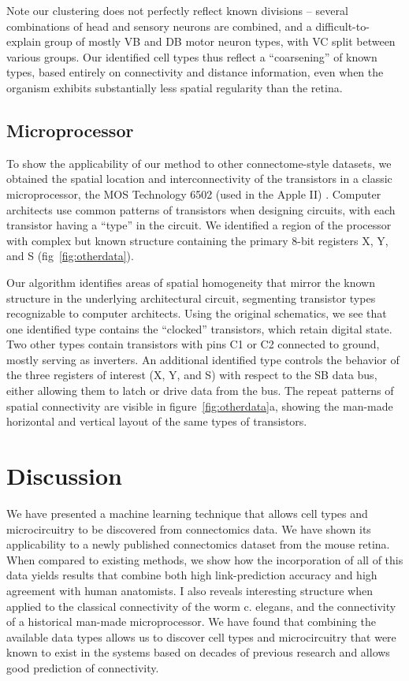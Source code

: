 \documentclass{article}
\begin{document}
Note our clustering does not perfectly reflect known divisions --
several combinations of head and sensory neurons are combined, and a
difficult-to-explain group of mostly VB and DB motor neuron types,
with VC split between various groups. Our identified cell types thus
reflect a ``coarsening'' of known types, based entirely on
connectivity and distance information, even when the organism exhibits
substantially less spatial regularity than the retina.


\subsection{Microprocessor}

To show the applicability of our method to other connectome-style
datasets, we obtained the spatial location and interconnectivity of
the transistors in a classic microprocessor, the MOS Technology 6502
(used in the Apple II) \autocite{James2010}. Computer architects use
common patterns of transistors when designing circuits, with each
transistor having a ``type'' in the circuit. We identified a region of
the processor with complex but known structure containing the primary
8-bit registers X, Y, and S (fig~\ref{fig:otherdata}).

Our algorithm identifies areas of spatial homogeneity that mirror the
known structure in the underlying architectural circuit, segmenting
transistor types recognizable to computer architects. Using the
original schematics, we see that one identified type contains the
``clocked'' transistors, which retain digital state. Two other types
contain transistors with pins C1 or C2 connected to ground, mostly
serving as inverters.  An additional identified type controls the
behavior of the three registers of interest (X, Y, and S) with respect
to the SB data bus, either allowing them to latch or drive data from
the bus. The repeat patterns of spatial connectivity are visible in
figure~\ref{fig:otherdata}a, showing the man-made horizontal and
vertical layout of the same types of transistors.

\section{Discussion}
We have presented a machine learning technique that allows cell types
and microcircuitry to be discovered from connectomics data.  We have
shown its applicability to a newly published connectomics dataset from
the mouse retina. When compared to existing methods, we show how the
incorporation of all of this data yields results that combine both
high link-prediction accuracy and high agreement with human
anatomists.  I also reveals interesting structure when applied to the
classical connectivity of the worm c. elegans, and the connectivity of
a historical man-made microprocessor. We have found that combining the
available data types allows us to discover cell types and
microcircuitry that were known to exist in the systems based on
decades of previous research and allows good prediction of
connectivity.
\end{document}
